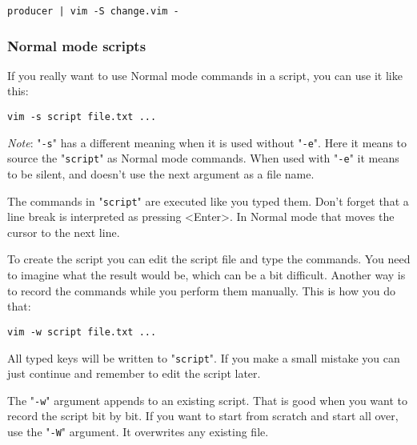 \begin{Verbatim}[samepage=true]
 producer | vim -S change.vim -
\end{Verbatim}

\subsubsection{Normal mode scripts}
If you really want to use Normal mode commands in a script, you can use it like this:

\begin{Verbatim}[samepage=true]
 vim -s script file.txt ...
\end{Verbatim}
 
\emph{Note}: "\verb!-s!" has a different meaning when it is used without "\verb!-e!".
Here it means to source the "\verb!script!" as Normal mode commands.
When used with "\verb!-e!" it means to be silent, and doesn't use the next argument as a file name.

The commands in "\verb!script!" are executed like you typed them.
Don't forget that a line break is interpreted as pressing <Enter>.
In Normal mode that moves the cursor to the next line.

To create the script you can edit the script file and type the commands.
You need to imagine what the result would be, which can be a bit difficult.
Another way is to record the commands while you perform them manually.
This is how you do that:

\begin{Verbatim}[samepage=true]
 vim -w script file.txt ...
\end{Verbatim}

All typed keys will be written to "\verb!script!".
If you make a small mistake you can just continue and remember to edit the script later.

The "\verb!-w!" argument appends to an existing script.
That is good when you want to record the script bit by bit.
If you want to start from scratch and start all over, use the "\verb!-W!" argument.
It overwrites any existing file.
\clearpage
